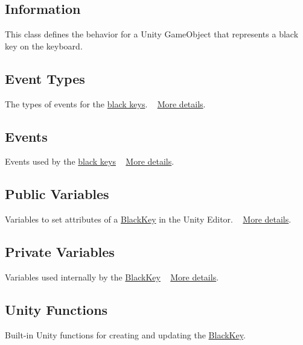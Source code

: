 \hypertarget{group___doc_black_key_DocBlackKeyInfo}{}\subsection{Information}\label{group___doc_black_key_DocBlackKeyInfo}
This class defines the behavior for a Unity Game\+Object that represents a black key on the keyboard.\hypertarget{group___doc_black_key_DocBlackKeyEventTypes}{}\subsection{Event Types}\label{group___doc_black_key_DocBlackKeyEventTypes}
The types of events for the \hyperlink{group___doc_black_key}{black keys}. ~\newline
 \hyperlink{group___black_key_event_types}{More details}.\hypertarget{group___doc_black_key_DocBlackKeyEvents}{}\subsection{Events}\label{group___doc_black_key_DocBlackKeyEvents}
Events used by the \hyperlink{group___doc_black_key}{black keys} ~\newline
 \hyperlink{group___black_key_events}{More details}.\hypertarget{group___doc_black_key_DocBlackKeyPubVar}{}\subsection{Public Variables}\label{group___doc_black_key_DocBlackKeyPubVar}
Variables to set attributes of a \hyperlink{class_black_key}{Black\+Key} in the Unity Editor. ~\newline
 \hyperlink{group___black_key_pub_var}{More details}.\hypertarget{group___doc_black_key_DocBlackKeyPrivVar}{}\subsection{Private Variables}\label{group___doc_black_key_DocBlackKeyPrivVar}
Variables used internally by the \hyperlink{class_black_key}{Black\+Key} ~\newline
 \hyperlink{group___black_key_priv_var}{More details}.\hypertarget{group___doc_black_key_DocBlackKeyUnity}{}\subsection{Unity Functions}\label{group___doc_black_key_DocBlackKeyUnity}
Built-\/in Unity functions for creating and updating the \hyperlink{class_black_key}{Black\+Key}. ~\newline
